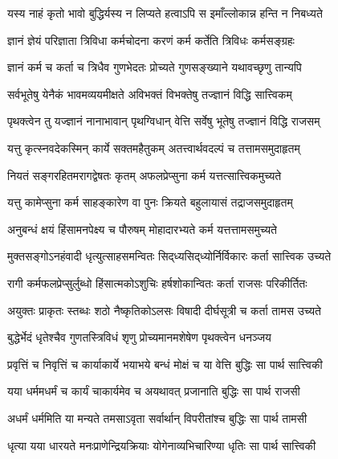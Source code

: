 \twolineshloka
{यस्य नाहं कृतो भावो बुद्धिर्यस्य न लिप्यते}
{हत्वाऽपि स इमाँल्लोकान्न हन्ति न निबध्यते}%

\twolineshloka
{ज्ञानं ज्ञेयं परिज्ञाता त्रिविधा कर्मचोदना}
{करणं कर्म कर्तेति त्रिविधः कर्मसङ्ग्रहः}%

\twolineshloka
{ज्ञानं कर्म च कर्ता च त्रिधैव गुणभेदतः}
{प्रोच्यते गुणसङ्ख्याने यथावच्छृणु तान्यपि}%

\twolineshloka
{सर्वभूतेषु येनैकं भावमव्ययमीक्षते}
{अविभक्तं विभक्तेषु तज्ज्ञानं विद्धि सात्त्विकम्}%

\twolineshloka
{पृथक्त्वेन तु यज्ज्ञानं नानाभावान् पृथग्विधान्}
{वेत्ति सर्वेषु भूतेषु तज्ज्ञानं विद्धि राजसम्}%

\twolineshloka
{यत्तु कृत्स्नवदेकस्मिन् कार्ये सक्तमहैतुकम्}
{अतत्त्वार्थवदल्पं च तत्तामसमुदाहृतम्}%

\twolineshloka
{नियतं सङ्गरहितमरागद्वेषतः कृतम्}
{अफलप्रेप्सुना कर्म यत्तत्सात्त्विकमुच्यते}%

\twolineshloka
{यत्तु कामेप्सुना कर्म साहङ्कारेण वा पुनः}
{क्रियते बहुलायासं तद्राजसमुदाहृतम्}%

\twolineshloka
{अनुबन्धं क्षयं हिंसामनपेक्ष्य च पौरुषम्}
{मोहादारभ्यते कर्म यत्तत्तामसमुच्यते}%

\twolineshloka
{मुक्तसङ्गोऽनहंवादी धृत्युत्साहसमन्वितः}
{सिद्‌ध्यसिद्‌ध्योर्निर्विकारः कर्ता सात्त्विक उच्यते}%

\twolineshloka
{रागी कर्मफलप्रेप्सुर्लुब्धो हिंसात्मकोऽशुचिः}
{हर्षशोकान्वितः कर्ता राजसः परिकीर्तितः}%

\twolineshloka
{अयुक्तः प्राकृतः स्तब्धः शठो नैष्कृतिकोऽलसः}
{विषादी दीर्घसूत्री च कर्ता तामस उच्यते}%

\twolineshloka
{बुद्धेर्भेदं धृतेश्चैव गुणतस्त्रिविधं शृणु}
{प्रोच्यमानमशेषेण पृथक्त्वेन धनञ्जय}%

\twolineshloka
{प्रवृत्तिं च निवृत्तिं च कार्याकार्ये भयाभये}
{बन्धं मोक्षं च या वेत्ति बुद्धिः सा पार्थ सात्त्विकी}%

\twolineshloka
{यया धर्ममधर्मं च कार्यं चाकार्यमेव च}
{अयथावत् प्रजानाति बुद्धिः सा पार्थ राजसी}%

\twolineshloka
{अधर्मं धर्ममिति या मन्यते तमसाऽवृता}
{सर्वार्थान् विपरीतांश्च बुद्धिः सा पार्थ तामसी}%

\twolineshloka
{धृत्या यया धारयते मनःप्राणेन्द्रियक्रियाः}
{योगेनाव्यभिचारिण्या धृतिः सा पार्थ सात्त्विकी}%

